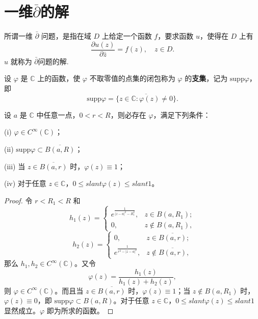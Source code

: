 \documentclass[../../main.tex]{subfiles}
\begin{document}
\section{一维$\overline{\partial }$的解}

\begin{definition}
所谓一维 \( \bar{\partial} \) 问题，是指在域 \( D \) 上给定一个函数 \( f \)，要求函数 \( u \)，使得在 \( D \) 上有
\[
\frac{\partial u(z)}{\partial \bar{z}} = f(z), \quad z \in D.
\]
\( u \) 就称为 \( \bar{\partial} \)问题的解.
\end{definition}

\begin{definition}
设 \( \varphi \) 是 \( \mathbb{C} \) 上的函数，使 \( \varphi \) 不取零值的点集的闭包称为 \( \varphi \) 的\textbf{支集}，记为 \( \text{supp}\varphi \)，即
\[
\text{supp}\varphi = \overline{\{ z \in \mathbb{C} : \varphi(z) \neq 0 \}}.
\]
\end{definition}

\begin{lemma}\label{lemma:引理3.7.2}
设 \( a \) 是 \( \mathbb{C} \) 中任意一点，\( 0 < r < R \)，则必存在 \( \varphi \)，满足下列条件：

(i) \( \varphi \in C^\infty(\mathbb{C}) \)；

(ii) \( \text{supp}\varphi \subset \overline{B(a,R)} \)；

(iii) 当 \( z \in \overline{B(a,r)} \) 时，\( \varphi(z) \equiv 1 \)；

(iv) 对于任意 \( z \in \mathbb{C} \)，\( 0 \leqslant slant \varphi(z) \leqslant slant 1 \)。
\end{lemma}
\begin{proof}
令 \( r < R_1 < R \) 和
\[
h_1(z) = \begin{cases} 
\displaystyle e^{\frac{1}{|z - a|^2 - R_1^2}}, & z \in B(a,R_1); \\
0, & z \notin B(a,R_1),
\end{cases}
\]
\[
h_2(z) = \begin{cases} 
0, & z \in \overline{B(a,r)}; \\
\displaystyle e^{\frac{1}{r^2 - |z - a|^2}}, & z \notin \overline{B(a,r)},
\end{cases}
\]
那么 \( h_1, h_2 \in C^\infty(\mathbb{C}) \)。又令
\[
\varphi(z) = \frac{h_1(z)}{h_1(z) + h_2(z)},
\]
则 \( \varphi \in C^\infty(\mathbb{C}) \)。而且当 \( z \in \overline{B(a,r)} \) 时，\( \varphi(z) \equiv 1 \)；当 \( z \notin B(a,R_1) \) 时，\( \varphi(z) \equiv 0 \)，即 \( \text{supp}\varphi \subset B(a,R) \)。对于任意 \( z \in \mathbb{C} \)，\( 0 \leqslant slant \varphi(z) \leqslant slant 1 \) 显然成立。\( \varphi \) 即为所求的函数。
\end{proof}
\end{document}
